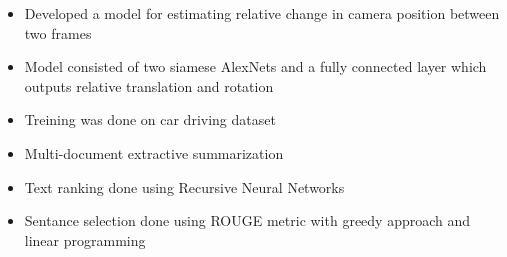 \documentclass[10pt,a4paper]{source/altacv}
\begin{document}


\medskip



\begin{itemize}
    \item \small{Developed a model for estimating relative change in camera position between two frames}
    \item \small{Model consisted of two siamese AlexNets and a fully connected layer which outputs relative translation and rotation}
    \item \small{Treining was done on car driving dataset}
    \\
    \smallskip
      
\end{itemize}
    
\divider


\begin{itemize}
  \item \small{Multi-document extractive summarization}
  \item \small{Text ranking done using Recursive Neural Networks}
  \item \small{Sentance selection done using ROUGE metric with greedy approach and linear programming}
  \\
  \smallskip
    
\end{itemize}

\divider

%
\end{document}
